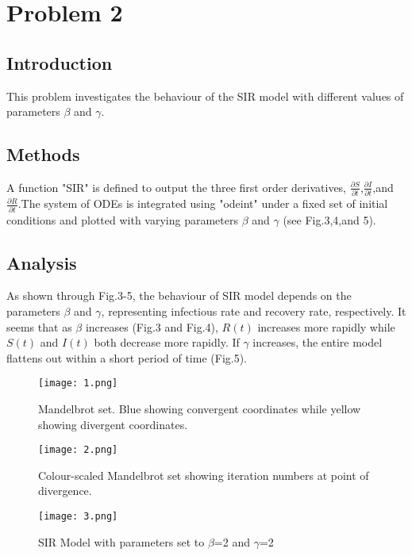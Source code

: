 \documentclass[apj]{emulateapj}
\begin{document}
\section{Problem 2}
\label{sec:Problem 2}

\subsection{Introduction}
\label{sec:Introduction}
This problem investigates the behaviour of the SIR model with different values of parameters $\beta$ and $\gamma$. 

\subsection{Methods}
\label{sec:Methods}
A function "SIR" is defined to output the three first order derivatives, $\frac{\partial S}{\partial t}$,$\frac{\partial I}{\partial t}$,and $\frac{\partial R}{\partial t}$.The system of ODEs is integrated using "odeint" under a fixed set of initial conditions and plotted with varying parameters $\beta$ and $\gamma$ (see Fig.3,4,and 5).

\subsection{Analysis}
\label{sec:Analysis}
As shown through Fig.3-5, the behaviour of SIR model depends on the parameters $\beta$ and $\gamma$, representing infectious rate and recovery rate, respectively. It seems that as $\beta$ increases (Fig.3 and Fig.4), $R(t)$ increases more rapidly while $S(t)$ and $I(t)$ both decrease more rapidly. If $\gamma$ increases, the entire model flattens out within a short period of time (Fig.5).
\begin{figure} [hbt!]
\texttt{[image: 1.png]}
\caption{Mandelbrot set. Blue showing convergent coordinates while yellow showing divergent coordinates.}
\label{fig:figureOfSpectrum}
\end{figure}


\begin{figure} [hbt!]
\texttt{[image: 2.png]}
\caption{Colour-scaled Mandelbrot set showing iteration numbers at point of divergence.}
\label{fig:figureOfSpectrum}
\end{figure}

\begin{figure} 
\texttt{[image: 3.png]}
\caption{SIR Model with parameters set to $\beta$=2 and $\gamma$=2}
\label{fig:figureOfSpectrum}
\end{figure}
\end{document}
